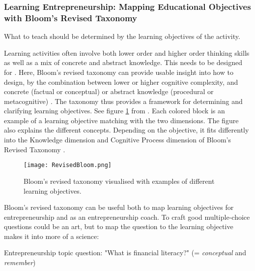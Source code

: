 
%


  \subsubsection{Learning Entrepreneurship: Mapping Educational Objectives with Bloom's Revised Taxonomy}

  What to teach should be determined by the learning objectives of the activity.

  Learning activities often involve both lower order and higher order thinking skills as well as a mix of concrete and abstract knowledge. This needs to be designed for . Here, Bloom's revised taxonomy can provide usable insight into how to design, by the combination between lower or higher cognitive complexity, and concrete (factual or conceptual) or abstract knowledge (procedural or metacognitive) \citep{cheong}. The taxonomy thus provides a framework for determining and clarifying learning objectives. See figure \ref{fig:revised-bloom} from \cite{heer}. Each colored block is an example of a learning objective matching with the two dimensions. The figure also explains the different concepts. Depending on the objective, it fits differently into the Knowledge dimension and Cognitive Process dimension of Bloom's Revised Taxonomy \citep{krathwohl}.

  \begin{figure}[h]
    \centering
    \texttt{[image: RevisedBloom.png]}
    \caption{Bloom's revised taxonomy visualised with examples of different learning objectives.}
    \label{fig:revised-bloom}
\end{figure}

  Bloom's revised taxonomy can be useful both to map learning objectives for entrepreneurship and as an entrepreneurship coach. To craft good multiple-choice questions could be an art, but to map the question to the learning objective makes it into more of a science:

  Entrepreneurship topic question: "What is financial literacy?" (= \textit{conceptual} and \textit{remember})


